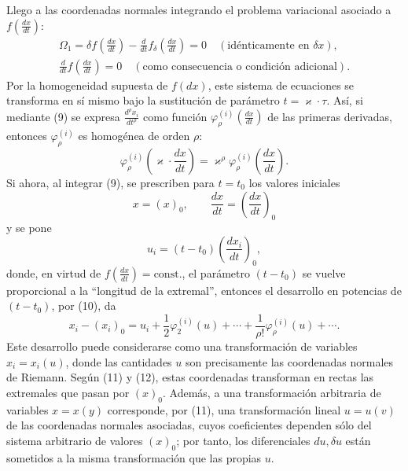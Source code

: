 Llego a las coordenadas normales integrando el problema variacional asociado a
\(f\!\left(\frac{dx}{dt}\right)\):
\begin{equation}
\begin{gathered}
\Omega_1=\delta f\!\left(\frac{dx}{dt}\right)
-\frac{d}{dt}f_\delta\!\left(\frac{dx}{dt}\right)=0
\quad(\text{idénticamente en }\delta x),\\
\frac{d}{dt}f\!\left(\frac{dx}{dt}\right)=0
\quad(\text{como consecuencia o condición adicional}).
\end{gathered}
\tag{9}
\end{equation}
Por la homogeneidad supuesta de \(f(dx)\), este sistema de ecuaciones se
transforma en sí mismo bajo la sustitución de parámetro \(t=\varkappa\cdot\tau\).
Así, si mediante (9) se expresa \(\frac{d^\rho x_i}{dt^\rho}\) como función
\(\varphi_\rho^{(i)}\!\left(\frac{dx}{dt}\right)\) de las primeras derivadas,
entonces \(\varphi_\rho^{(i)}\) es homogénea de orden \(\rho\):
\begin{equation}
\varphi_\rho^{(i)}\!\left(\varkappa\cdot\frac{dx}{dt}\right)
=\varkappa^\rho\varphi_\rho^{(i)}\!\left(\frac{dx}{dt}\right).
\tag{10}
\end{equation}
Si ahora, al integrar (9), se prescriben para \(t=t_0\) los valores iniciales
\[
x=(x)_0,\qquad \frac{dx}{dt}=\left(\frac{dx}{dt}\right)_0
\]
y se pone
\begin{equation}
u_i=(t-t_0)\left(\frac{dx_i}{dt}\right)_0,
\tag{11}
\end{equation}
donde, en virtud de \(f\!\left(\frac{dx}{dt}\right)=\mathrm{const.}\), el
parámetro \((t-t_0)\) se vuelve proporcional a la ``longitud de la extremal'',
entonces el desarrollo en potencias de \((t-t_0)\), por (10), da
\begin{equation}
x_i-(x_i)_0=u_i+\frac12\varphi_2^{(i)}(u)+\cdots+
\frac{1}{\rho!}\varphi_\rho^{(i)}(u)+\cdots .
\tag{12}
\end{equation}
Este desarrollo puede considerarse como una transformación de variables
\(x_i=x_i(u)\), donde las cantidades \(u\) son precisamente las coordenadas
normales de Riemann. Según (11) y (12), estas coordenadas transforman en rectas
las extremales que pasan por \((x)_0\). Además, a una transformación arbitraria
de variables \(x=x(y)\) corresponde, por (11), una transformación lineal
\(u=u(v)\) de las coordenadas normales asociadas, cuyos coeficientes dependen
sólo del sistema arbitrario de valores \((x)_0\); por tanto, los diferenciales
\(du,\delta u\) están sometidos a la misma transformación que las propias
\(u\).

